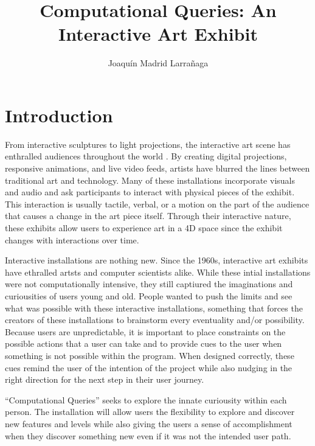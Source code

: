 \documentclass[10pt,twocolumn]{article}
\title{Computational Queries: An Interactive Art Exhibit}
\author{Joaquín Madrid Larrañaga}
\affiliation{Occidental College}
\begin{document}
\maketitle

\begin{abstract}
    
\end{abstract}

\section{Introduction}
From interactive sculptures to light projections, the interactive art scene has enthralled audiences throughout the world \cite{sarto_disneys_2021, noauthor_teamlab_2020}.  By creating digital projections, responsive animations, and live video feeds, artists have blurred the lines between traditional art and technology.  Many of these installations incorporate visuals and audio and ask participants to interact with physical pieces of the exhibit. This interaction is usually tactile, verbal, or a motion on the part of the audience that causes a change in the art piece itself.  Through their interactive nature, these exhibits allow users to experience art in a 4D space since the exhibit changes with interactions over time. 

Interactive installations are nothing new. Since the 1960s, interactive art exhibits have ethralled artsts and computer scientists alike\cite{trifonova_software_2008}.  While these intial installations were not computationally intensive, they still captiured the imaginations and curiousities of users young and old.  People wanted to push the limits and see what was possible with these interactive installations, something that forces the creators of these installations to brainstorm every eventuality and/or possibility.  Because users are unpredictable, it is important to place constraints on the possible actions that a user can take and to provide cues to the user when something is not possible within the program.  When designed correctly, these cues remind the user of the intention of the project while also nudging in the right direction for the next step in their user journey.  

``Computational Queries'' seeks to explore the innate curiousity within each person. The installation will allow users the flexibility to explore and discover new features and levels while also giving the users a sense of accomplishment when they discover something new even if it was not the intended user path. 
\end{document}
